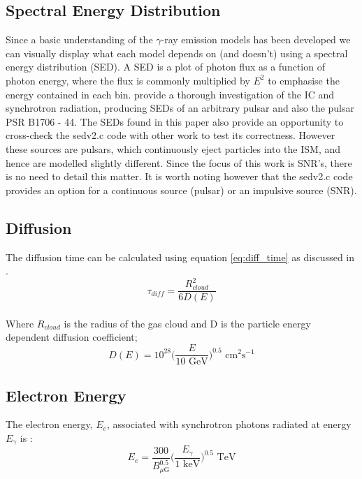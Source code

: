 \documentclass[12pt,a4paper]{article}
\begin{document}
\subsection{Spectral Energy Distribution}
Since a basic understanding of the $\gamma$-ray emission models has been developed we can visually display what each model depends on (and doesn't) using a spectral energy distribution (SED). A SED is a plot of photon flux as a function of photon energy, where the flux is commonly multiplied by $E^2$ to emphasise the energy contained in each bin. \cite{1997MNRAS.291..162A} provide a thorough investigation of the IC and synchrotron radiation, producing SEDs of an arbitrary pulsar and also the pulsar PSR B1706 - 44. The SEDs found in this paper also provide an opportunity to cross-check the sedv2.c code with other work to test its correctness. However these sources are pulsars, which continuously eject particles into the ISM, and hence are modelled slightly different. Since the focus of this work is SNR's, there is no need to detail this matter. It is worth noting however that the sedv2.c code provides an option for a continuous source (pulsar) or an impulsive source (SNR). 


\subsection{Diffusion}
The diffusion time can be calculated using equation \ref{eq:diff_time} as discussed in \cite{2009MNRAS.396.1629G}.
\begin{equation} \label{eq:diff_time}
\tau_{diff} = \dfrac{R_{cloud}^2}{6 D(E)}
\end{equation}\\
Where $R_{cloud}$ is the radius of the gas cloud and D is the particle energy dependent diffusion coefficient;
\begin{equation} \label{eq:diff_coef}
D(E) = 10^{28} \bigg( \dfrac{E}{10 \text{ GeV}} \bigg)^{0.5} \text{ cm}^2\text{s}^{-1}
\end{equation}

\subsection{Electron Energy}
The electron energy, $E_e$, associated with synchrotron photons radiated at energy $E_{\gamma}$ is \citep{1999ApJ...525..357S}:
\begin{equation} \label{eq:Ee_synch}
E_e = \dfrac{300}{B^{0.5}_{\mu \text{G}}} \bigg( \dfrac{E_{\gamma}}{1 \text{ keV}} \bigg)^{0.5} \text{ TeV}
\end{equation}
\end{document}
